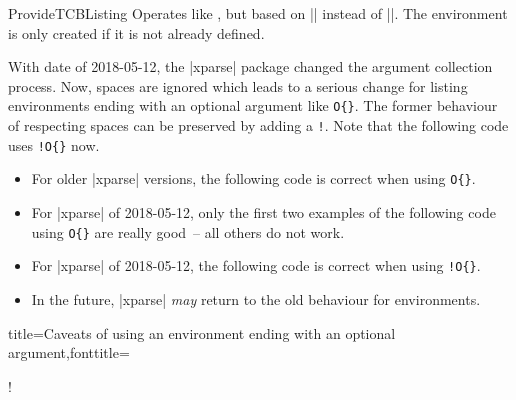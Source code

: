 \begin{docCommand}{ProvideTCBListing}{}
  Operates like , but based on |\ProvideDocumentEnvironment| instead of |\DeclareDocumentEnvironment|.
  The environment  is only created if it is not already defined.
\end{docCommand}

\clearpage


\begin{marker}
With date of 2018-05-12, the |xparse| \cite{latexproject:2015a} package
changed the argument collection process.
Now, spaces are ignored which leads to a serious change for listing environments
ending with an optional argument like \verb+O{}+.
The former behaviour of respecting spaces can be preserved by adding a \flqq\verb+!+\frqq.
Note that the following code uses \verb+!O{}+ now.
\begin{itemize}
\item For older |xparse| versions, the following code is correct when using \verb+O{}+.
\item For |xparse| of 2018-05-12, only the first two examples of
  the following code using \verb+O{}+ are really \flqq good\frqq\ -- all others do not work.
\item For |xparse| of 2018-05-12, the following code is correct when using \verb+!O{}+.
\item In the future, |xparse| \emph{may} return to the old behaviour for
  environments.
\end{itemize}
\end{marker}





\begin{dispListing*}{title={Caveats of using an environment ending with an
  optional argument},fonttitle=\bfseries}

\begin{mybox}[colframe=red]
\good
\end{mybox}

\begin{mybox}[colframe=red]\good\end{mybox}

\begin{mybox}
\good
\end{mybox}

\begin{mybox} \good\end{mybox}

\begin{mybox}\bad!\end{mybox}

\begin{mybox}
[\good]
\end{mybox}

\begin{mybox} [\good]\end{mybox}

\begin{mybox}[\bad!]\end{mybox}
\end{dispListing*}

